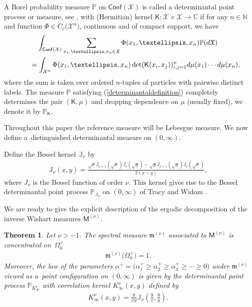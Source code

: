 \documentclass[11pt]{article}
\numberwithin{equation}{section}
\newtheorem{Theorem}{Theorem}[section]
\begin{document}
A Borel probability measure $\mathbb{P}$ on $\mathsf{Conf}(\mathcal{X})$ is called a determinantal point process or measure, see \cite{Soshnikov}, with (Hermitian) kernel $\mathsf{K}\colon \mathcal{X} \times \mathcal{X} \to \mathbb{C}$ if for any $n\in \mathbb{N}$ and function $\Phi\in C_c\big(\mathcal{X}^n\big)$, continuous and of compact support, we have
\begin{gather}
\int_{\mathsf{Conf}(\mathcal{X})}^{} \sum_{x_1, \dots,x_n \in \mathfrak{X}}\Phi(x_1,\dots,x_n)\mathbb{P}({\rm d}\mathfrak{X})\nonumber\\
\qquad{} =\int_{\mathcal{X}^n}^{}\Phi(x_1,\dots,x_n)\det (\mathsf{K}(x_i,x_j) )_{i,j=1}^n{\rm d}\mu(x_1)\cdots {\rm d}\mu(x_n),\label{determinantaldefinition}
\end{gather}
where the sum is taken over ordered $n$-tuples of particles with pairwise distinct labels. The measure $\mathbb{P}$ satisfying (\ref{determinantaldefinition}) completely determines the pair $(\mathsf{K},\mu)$ and dropping dependence on $\mu$ (usually fixed), we denote it by $\mathbb{P}_{\mathsf{K}}$.

Throughout this paper the reference measure will be Lebesgue measure. We now define a~distinguished determinantal measure on $(0,\infty)$.

\begin{Definition}Define the Bessel kernel $\mathbb{J}_{\nu}$ by
\begin{gather*}
\mathbb{J}_{\nu}(x,y)=\frac{\sqrt{x}J_{\nu+1}(\sqrt{x})J_{\nu}(\sqrt{y})-\sqrt{y}J_{\nu+1}(\sqrt{y})J_{\nu}(\sqrt{x})}{2(x-y)},
\end{gather*}
where $J_{\nu}$ is the Bessel function of order $\nu$. This kernel gives rise to the Bessel determinantal point process $\mathbb{P}_{\mathbb{J}_{\nu}}$ on $(0,\infty)$ of Tracy and Widom \cite{TracyWidom}.
\end{Definition}

We are ready to give the explicit description of the ergodic decomposition of the inverse Wishart measures $\mathsf{M}^{(\nu)}$.

\begin{Theorem}\label{MainTheorem}
Let $\nu> -1$. The spectral measure $\mathfrak{m}^{(\nu)}$ associated to $\mathsf{M}^{(\nu)}$ is concentrated on~$\Omega_0^+$
\begin{gather*}
\mathfrak{m}^{(\nu)}\big(\Omega_0^+\big)=1.
\end{gather*}
Moreover, the law of the parameters $\alpha^+=\big(\alpha_1^+\ge \alpha_2^+ \ge \alpha_3^+ \ge \cdots \ge 0 \big)$ under $\mathfrak{m}^{(\nu)}$ viewed as a~point configuration on $(0,\infty)$ is given by the determinantal point process $\mathbb{P}_{K^{\nu}_{\infty}}$ with correlation kernel $K_{\infty}^{\nu}(x,y)$ defined by
\begin{gather*}
K_{\infty}^{\nu}(x,y)=\frac{8}{xy} \mathbb{J}_{\nu}\left(\frac{8}{x},\frac{8}{y}\right).
\end{gather*}
\end{Theorem}
\end{document}
